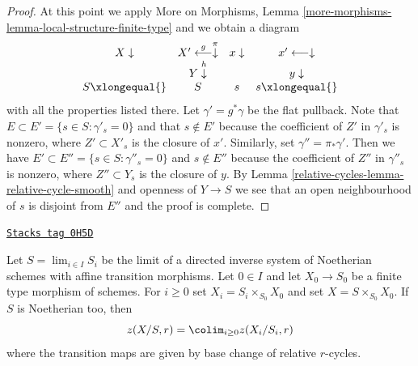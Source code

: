 \begin{proof}
\medskip\noindent
At this point we apply More on Morphisms, Lemma
\ref{more-morphisms-lemma-local-structure-finite-type}
and we obtain a diagram
$$
\begin{array}{cccc}X \downarrow & X' \overset{g}{\longleftarrow}\overset{\pi}{\downarrow} & x \downarrow & x' \longleftarrow\downarrow \\  & Y \overset{h}{\downarrow} &  & y \downarrow \\ S \xlongequal{} & S & s & s \xlongequal{}\end{array}
$$
with all the properties listed there. Let $\gamma' = g^*\gamma$
be the flat pullback. Note that $E \subset E' = \{s \in S: \gamma'_s = 0\}$
and that $s \not \in E'$ because the coefficient of $Z'$ in $\gamma'_s$
is nonzero, where $Z' \subset X'_s$ is the closure of $x'$.
Similarly, set $\gamma'' = \pi_*\gamma'$. Then we have
$E' \subset E'' = \{s \in S: \gamma''_s = 0\}$ and $s \not \in E''$
because the coefficient of $Z''$ in $\gamma''_s$ is nonzero, where
$Z'' \subset Y_s$ is the closure of $y$. By
Lemma \ref{relative-cycles-lemma-relative-cycle-smooth} and openness of $Y \to S$
we see that an open neighbourhood of $s$ is disjoint from $E''$
and the proof is complete.
\end{proof}

\begin{lemma}
\label{relative-cycles-lemma-descend-through-limit}
\href{https://stacks.math.columbia.edu/tag/0H5D}{\texttt{Stacks tag 0H5D}}

Let $S = \lim_{i \in I} S_i$ be the limit of a directed inverse system of
Noetherian schemes with affine transition morphisms.
Let $0 \in I$ and let $X_0 \to S_0$ be a finite type morphism of schemes.
For $i \geq 0$ set $X_i = S_i \times_{S_0} X_0$ and set
$X = S \times_{S_0} X_0$. If $S$ is Noetherian too, then
$$
z(X/S, r) = \colim_{i \geq 0} z(X_i/S_i, r)
$$
where the transition maps are given by base change of relative
$r$-cycles.
\end{lemma}

